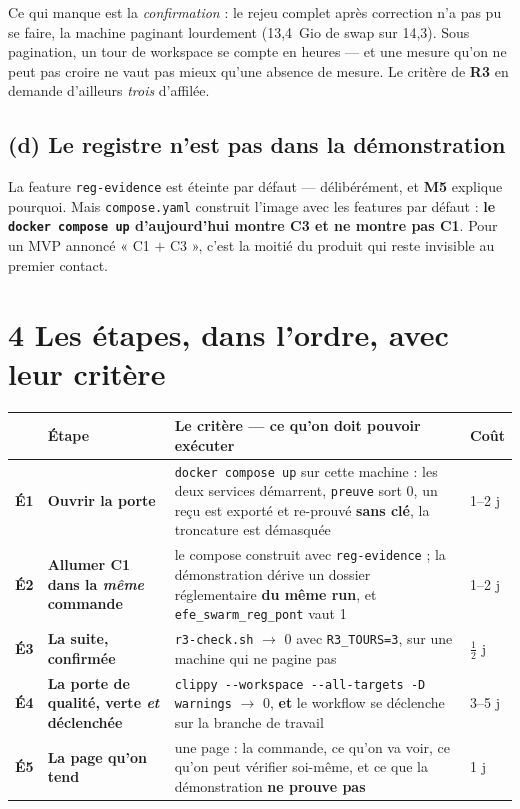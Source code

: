 \documentclass[11pt]{article}
\newcommand{\code}[1]{\texttt{\small #1}}
\newcommand{\mm}[1]{\textbf{#1}}
\newcommand{\sz}[1]{{\small #1}}
\newcommand{\fl}{$\rightarrow$}
\begin{document}
Ce qui manque est la \emph{confirmation} : le rejeu complet après correction n'a pas pu se faire, la
machine paginant lourdement (13,4~Gio de swap sur 14,3). Sous pagination, un tour de workspace se
compte en heures --- et une mesure qu'on ne peut pas croire ne vaut pas mieux qu'une absence de
mesure. Le critère de \mm{R3} en demande d'ailleurs \emph{trois} d'affilée.

\subsection{(d) Le registre n'est pas dans la démonstration}
La feature \code{reg-evidence} est éteinte par défaut --- délibérément, et \mm{M5} explique pourquoi.
Mais \code{compose.yaml} construit l'image avec les features par défaut : \textbf{le
\code{docker compose up} d'aujourd'hui montre C3 et ne montre pas C1}. Pour un MVP annoncé
« C1 $+$ C3 », c'est la moitié du produit qui reste invisible au premier contact.

\section{4 \;\textbar\; Les étapes, dans l'ordre, avec leur critère}

\begin{center}\small
\renewcommand{\arraystretch}{1.3}
\begin{tabular}{@{}>{\raggedright\arraybackslash}p{0.7cm} >{\raggedright\arraybackslash}p{4.1cm} >{\raggedright\arraybackslash}p{8.3cm} >{\raggedright\arraybackslash}p{2.1cm}@{}}
\toprule
& \textbf{Étape} & \textbf{Le critère --- ce qu'on doit pouvoir exécuter} & \textbf{Coût} \\
\midrule
\mm{É1} & \textbf{Ouvrir la porte} & \code{docker compose up} sur cette machine : les deux services
démarrent, \code{preuve} sort 0, un reçu est exporté et re-prouvé \textbf{sans clé}, la troncature est
démasquée & \sz{1--2 j} \\
\mm{É2} & \textbf{Allumer C1 dans la \emph{même} commande} & le compose construit avec
\code{reg-evidence} ; la démonstration dérive un dossier réglementaire \textbf{du même run}, et
\code{efe\_swarm\_reg\_pont} vaut 1 & \sz{1--2 j} \\
\mm{É3} & \textbf{La suite, confirmée} & \code{r3-check.sh} \fl{} 0 avec \code{R3\_TOURS=3}, sur une
machine qui ne pagine pas & \sz{$\frac{1}{2}$ j} \\
\mm{É4} & \textbf{La porte de qualité, verte \emph{et} déclenchée} & \code{clippy -{}-workspace
-{}-all-targets -D warnings} \fl{} 0, \textbf{et} le workflow se déclenche sur la branche de travail
& \sz{3--5 j} \\
\mm{É5} & \textbf{La page qu'on tend} & une page : la commande, ce qu'on va voir, ce qu'on peut
vérifier soi-même, et ce que la démonstration \textbf{ne prouve pas} & \sz{1 j} \\
\bottomrule
\end{tabular}
\end{center}
\end{document}

